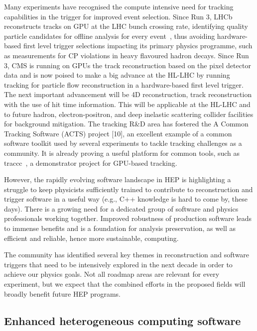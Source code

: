 \documentclass[10pt,a4paper]{article}
\begin{document}
Many experiments have recognised the compute intensive need for tracking
capabilities in the trigger for improved event selection. Since Run 3, LHCb
reconstructs tracks on GPU at the LHC bunch crossing rate, identifying quality
particle candidates for offline analysis for every event~\cite{LHCb:HLT}, thus
avoiding hardware-based first level trigger selections impacting its primary
physics programme, such as measurements for CP violations in heavy flavoured
hadron decays. Since Run 3, CMS is running on GPUs the track reconstruction
based on the pixel detector data and is now poised to make a big advance at the
HL-LHC by running tracking for particle flow reconstruction in a hardware-based
first level trigger. The next important advancement will be 4D reconstruction,
track reconstruction with the use of hit time information. This will be
applicable at the HL-LHC and to future hadron, electron-positron, and deep
inelastic scattering collider facilities for background mitigation. The tracking
R\&D area has fostered the A Common Tracking Software (ACTS) project {[}10{]},
an excellent example of a common software toolkit used by several experiments to
tackle tracking challenges as a community. It is already proving a useful
platform for common tools, such as traccc~\cite{traccc}, a demonstrator project
for GPU-based tracking.

However, the rapidly evolving software landscape in HEP is highlighting a
struggle to keep physicists sufficiently trained to contribute to reconstruction
and trigger software in a useful way (e.g., C++ knowledge is hard to come by,
these days). There is a growing need for a dedicated group of software and
physics professionals working together. Improved robustness of production
software leads to immense benefits and is a foundation for analysis
preservation, as well as efficient and reliable, hence more sustainable,
computing.


The community has identified several key themes in reconstruction and software
triggers that need to be intensively explored in the next decade in order to
achieve our physics goals. Not all roadmap areas are relevant for every
experiment, but we expect that the combined efforts in the proposed fields will
broadly benefit future HEP programs.

\subsection{Enhanced heterogeneous computing
software}\label{enhanced-heterogeneous-computing-software}
\end{document}

